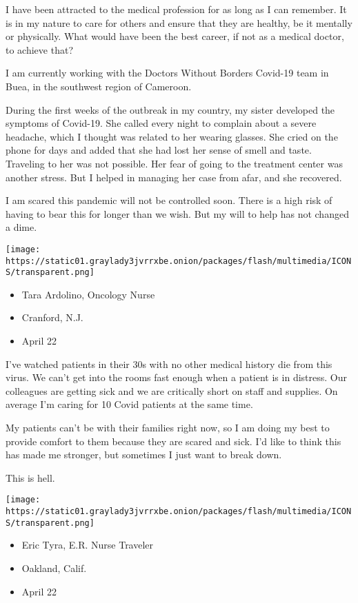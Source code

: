 I have been attracted to the medical profession for as long as I can
remember. It is in my nature to care for others and ensure that they are
healthy, be it mentally or physically. What would have been the best
career, if not as a medical doctor, to achieve that?

I am currently working with the Doctors Without Borders Covid-19 team in
Buea, in the southwest region of Cameroon.

During the first weeks of the outbreak in my country, my sister
developed the symptoms of Covid-19. She called every night to complain
about a severe headache, which I thought was related to her wearing
glasses. She cried on the phone for days and added that she had lost her
sense of smell and taste. Traveling to her was not possible. Her fear of
going to the treatment center was another stress. But I helped in
managing her case from afar, and she recovered.

I am scared this pandemic will not be controlled soon. There is a high
risk of having to bear this for longer than we wish. But my will to help
has not changed a dime.

\texttt{[image: https://static01.graylady3jvrrxbe.onion/packages/flash/multimedia/ICONS/transparent.png]}

\begin{itemize}
\tightlist
\item
  Tara Ardolino, Oncology Nurse
\item
  Cranford, N.J.
\item
  April 22
\end{itemize}

I've watched patients in their 30s with no other medical history die
from this virus. We can't get into the rooms fast enough when a patient
is in distress. Our colleagues are getting sick and we are critically
short on staff and supplies. On average I'm caring for 10 Covid patients
at the same time.

My patients can't be with their families right now, so I am doing my
best to provide comfort to them because they are scared and sick. I'd
like to think this has made me stronger, but sometimes I just want to
break down.

This is hell.

\texttt{[image: https://static01.graylady3jvrrxbe.onion/packages/flash/multimedia/ICONS/transparent.png]}

\begin{itemize}
\tightlist
\item
  Eric Tyra, E.R. Nurse Traveler
\item
  Oakland, Calif.
\item
  April 22
\end{itemize}

